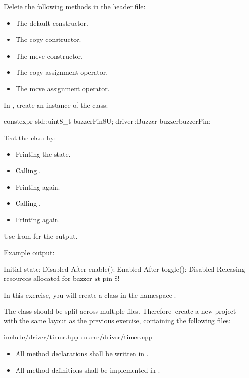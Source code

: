 \begin{parts}
  \item Delete the following methods in the header file:
  \begin{itemize}
    \item The default constructor.
    \item The copy constructor.
    \item The move constructor.
    \item The copy assignment operator.
    \item The move assignment operator.
  \end{itemize}
  \item In , create an instance of the class:
\begin{cppcode}
constexpr std::uint8_t buzzerPin{8U};
driver::Buzzer buzzer{buzzerPin};
\end{cppcode}
  Test the class by:
  \begin{itemize}
    \item Printing the state.
    \item Calling .
    \item Printing again.
    \item Calling .
    \item Printing again.
  \end{itemize}
  Use  from  for the output.
\end{parts}
Example output:

\begin{console}
Initial state: Disabled
After enable(): Enabled
After toggle(): Disabled
Releasing resources allocated for buzzer at pin 8!
\end{console}

\label{c2:set:4}

\label{c2:ex:4.1}
In this exercise, you will create a class  in the namespace .

The class should be split across multiple files. Therefore, create a new project with the same
layout as the previous exercise, containing the following files:

\begin{console}
include/driver/timer.hpp
source/driver/timer.cpp
\end{console}

\note
\begin{itemize}
  \item All method declarations shall be written in .
  \item All method definitions shall be implemented in .
\end{itemize}

